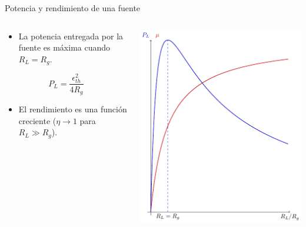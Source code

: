 \documentclass[aspectratio=169, usenames,svgnames,dvipsnames]{beamer}
\begin{document}
\begin{frame}[label={sec:org281db19}]{Potencia y rendimiento de una fuente}
\begin{columns}
\begin{column}{0.5\columnwidth}
\begin{itemize}
\item La potencia entregada por la fuente es máxima cuando \(R_L = R_g\).
\end{itemize}

\begin{equation*}
  P_L = \frac{\epsilon^2_{th}}{4 R_g}
\end{equation*}

\begin{itemize}
\item El rendimiento es una función creciente (\(\eta \to 1\) para \(R_L \gg R_g\)).
\end{itemize}
\end{column}

\begin{column}{0.5\columnwidth}
\begin{center}
\includegraphics[height=0.85\textheight]{../figs/FuenteReal_PotenciaRendimiento.pdf}
\end{center}
\end{column}
\end{columns}
\end{frame}
\end{document}
